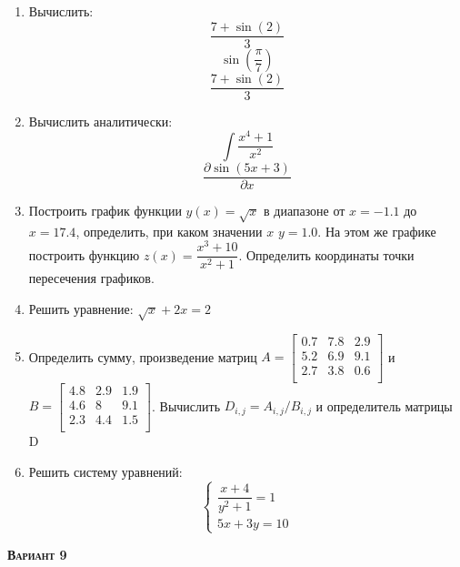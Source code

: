 \begin{enumerate}
\item Вычислить: 
\begin{equation*}\dfrac{7+\sin(2)}{3}              \end{equation*}
\begin{equation*}\sin \left( \dfrac{\pi}{7} \right)\end{equation*}
\begin{equation*}\dfrac{7+\sin(2)}{3}              \end{equation*}

\item Вычислить аналитически: 
 \begin{equation*} \int \dfrac{x^4+1}{x^2} \end{equation*}\begin{equation*} {\dfrac{\partial \sin(5 x +3)}{\partial x}} \end{equation*}
\item Построить график функции $y(x)=\sqrt{x}         $ в диапазоне от $x=-1.1$ до $x=17.4$, определить, при каком значении $x$ $y=1.0$. На этом же графике построить функцию $z(x)=\dfrac{x^3+10}{x^2+1}     $. Определить координаты точки пересечения графиков. \item Решить уравнение: $\sqrt{x}+2x=2        $

\item Определить сумму, произведение матриц $A=\begin{bmatrix}
0.7 &7.8 &2.9 \\
5.2 &6.9 &9.1 \\
2.7 &3.8 &0.6 \\
\end{bmatrix}
$ и $B=\begin{bmatrix}
4.8 &2.9 &1.9 \\
4.6 &8 &9.1 \\
2.3 &4.4 &1.5 \\
\end{bmatrix}
$. Вычислить $D_{i,j}=A_{i,j}  /  B_{i,j}$ и определитель матрицы D

\item Решить систему уравнений: \begin{equation*} \begin{cases} \dfrac{x+4}{y^2+1}=1 \\ 5x +3y=10             \end{cases} \end{equation*} 

\end{enumerate}
\textsc{\textbf{Вариант 9}}

